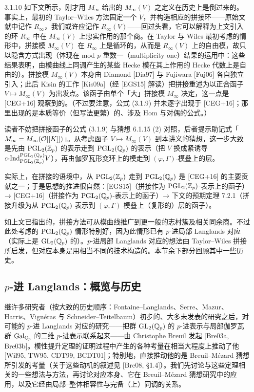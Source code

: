 \begin{rem}{3.1.10}\label{rem:a4-3-1-10}
如下文所示，刚才用 $M_\infty$ 给出的 $M_\infty(V)$ 之定义在历史上是倒过来的。事实上，最初的 Taylor--Wiles 方法固定一个 $V$，并构造相应的拼接环——原始文献中记作 $R_\infty$，我们或许应记作 $R_\infty(V)$——回过头看，它可以解释为上文引入的环 $R_\infty$ 中在 $M_\infty(V)$ 上忠实作用的那个商。在 Taylor 与 Wiles 最初考虑的情形中，拼接模 $M_\infty(V)$ 在 $R_\infty$ 上是循环的，从而是 $R_\infty(V)$ 上的自由模，故只以隐含方式出现（体现在 mod $p$ 重数一（multiplicity one）结果的运用中：这些结果表明，由模曲线上同调产生的某些 Hecke 模在其上作用的 Hecke 代数上是自由的）。拼接模 $M_\infty(V)$ 本身由 Diamond [Dia97] 与 Fujiwara [Fuj06] 各自独立引入；此后 Kisin 的工作 [Kis09a]（经 [EGS15] 解读）把拼接重述为以正合函子 $V\mapsto M_\infty(V)$ 为出发点。该函子由单个「大」拼接模 $M_\infty$ 决定，这一点是 [CEG+16] 观察到的。（不过要注意，公式 (3.1.9) 并未逐字出现于 [CEG+16]；那里出现的是本质等价（但写法更繁）的、涉及 Hom 与对偶的公式。）
\end{rem}

读者不妨把拼接函子的公式 (3.1.9) 与猜想 6.1.15 (2) 对照，后者提示助记式「$M_\infty=M_\infty(\mathcal{O}[[K]])$」。从考虑函子 $V\mapsto M_\infty(V)$ 到本讲义的猜想，这一步大致是先由 $\mathrm{PGL}_2(\mathbb{Z}_p)$ 的表示走到 $\mathrm{PGL}_2(\mathbb{Q}_p)$ 的表示（把 $V$ 换成紧诱导 $c\text{-}\mathrm{Ind}_{\mathrm{PGL}_2(\mathbb{Z}_p)}^{\mathrm{PGL}_2(\mathbb{Q}_p)}V$），再由伽罗瓦形变环上的模走到 $(\varphi,\Gamma)$-模叠上的层。

实际上，在拼接的语境中，从 $\mathrm{PGL}_2(\mathbb{Z}_p)$ 走到 $\mathrm{PGL}_2(\mathbb{Q}_p)$ 是 [CEG+16] 的主要贡献之一；于是思想的推进很自然：[EGS15]（拼接作为 $\mathrm{PGL}_2(\mathbb{Z}_p)$-表示上的函子）→ [CEG+16]（拼接作为 $\mathrm{PGL}_2(\mathbb{Q}_p)$-表示上的函子）→ 下文的预期定理 7.2.1（拼接升级为从 $\mathrm{PGL}_2(\mathbb{Q}_p)$-表示到 $(\varphi,\Gamma)$-模叠上（复形的）层的函子）。

如上文已指出的，拼接方法可从模曲线推广到更一般的志村簇及相关同余商。不过此处考虑的 $\mathrm{PGL}_2(\mathbb{Q}_p)$ 情形特别好，因为此情形已有 $p$-进局部 Langlands 对应（实际上是 $\mathrm{GL}_2(\mathbb{Q}_p)$ 的）。$p$-进局部 Langlands 对应的想法由 Taylor--Wiles 拼接所启发，但对应本身是用相当不同的技术构造的。本节余下部分回顾其中一些历史。

\subsection{$p$-进 Langlands：概览与历史}

继许多研究者（按大致的历史顺序：Fontaine--Langlands、Serre、Mazur、Harris、Vignéras 与 Schneider--Teitelbaum）初步的、大多未发表的研究之后，对可能的 $p$-进 Langlands 对应的研究——把群 $\mathrm{GL}_2(\mathbb{Q}_p)$ 的 $p$-进表示与局部伽罗瓦群 $\mathrm{Gal}_{\mathbb{Q}_p}$ 的二维 $p$-进表示联系起来——由 Christophe Breuil 发起 [Bre03a, Bre03b]。模性提升定理的证明过程中产生的各种考量在相当大程度上推动了他 [Wil95, TW95, CDT99, BCDT01]；特别地，直接推动他的是 Breuil--Mézard 猜想所引发的考量（关于这些动机的叙述见 [Bre08, §1.4]）。我们先讨论与这些定理相关的一些想法与方法，再讨论对应本身、它在 Breuil--Mézard 猜想研究中的应用，以及它经由局部--整体相容性与完备（上）同调的关系。

